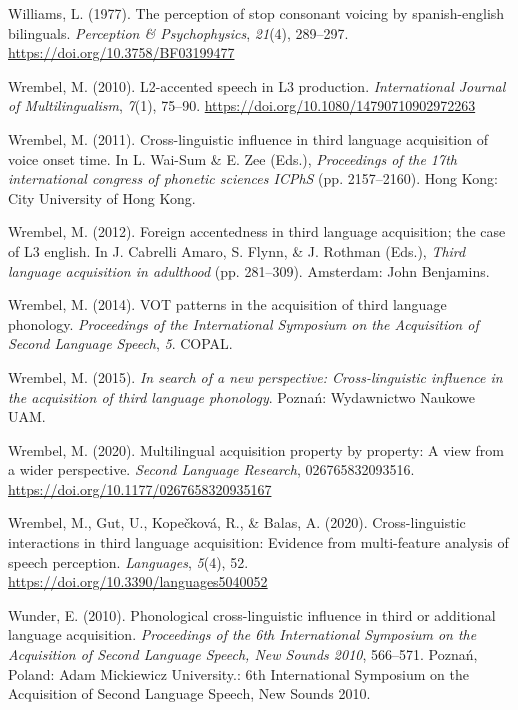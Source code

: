 \documentclass[
  man]{apa6}
\newlength{\cslhangindent}
\newlength{\cslentryspacingunit} %
\newenvironment{CSLReferences}[2] %
 {%
  \setlength{\parindent}{0pt}
  \ifodd #1
  \let\oldpar\par
  \def\par{\hangindent=\cslhangindent\oldpar}
  \fi
  \setlength{\parskip}{#2\cslentryspacingunit}
 }%
 {}
\begin{document}
\begin{CSLReferences}{1}{0}
\leavevmode{}%
Williams, L. (1977). The perception of stop consonant voicing by spanish-english bilinguals. \emph{Perception \& Psychophysics}, \emph{21}(4), 289--297. \url{https://doi.org/10.3758/BF03199477}

\leavevmode{}%
Wrembel, M. (2010). L2-accented speech in L3 production. \emph{International Journal of Multilingualism}, \emph{7}(1), 75--90. \url{https://doi.org/10.1080/14790710902972263}

\leavevmode{}%
Wrembel, M. (2011). Cross-linguistic influence in third language acquisition of voice onset time. In L. Wai-Sum \& E. Zee (Eds.), \emph{Proceedings of the 17th international congress of phonetic sciences {ICPhS}} (pp. 2157--2160). Hong Kong: City University of Hong Kong.

\leavevmode{}%
Wrembel, M. (2012). Foreign accentedness in third language acquisition; the case of L3 english. In J. Cabrelli Amaro, S. Flynn, \& J. Rothman (Eds.), \emph{Third language acquisition in adulthood} (pp. 281--309). Amsterdam: John Benjamins.

\leavevmode{}%
Wrembel, M. (2014). {VOT} patterns in the acquisition of third language phonology. \emph{Proceedings of the International Symposium on the Acquisition of Second Language Speech}, \emph{5}. {COPAL}.

\leavevmode{}%
Wrembel, M. (2015). \emph{In search of a new perspective: Cross-linguistic influence in the acquisition of third language phonology}. Poznań: Wydawnictwo Naukowe {UAM}.

\leavevmode{}%
Wrembel, M. (2020). Multilingual acquisition property by property: A view from a wider perspective. \emph{Second Language Research}, 026765832093516. \url{https://doi.org/10.1177/0267658320935167}

\leavevmode{}%
Wrembel, M., Gut, U., Kopečková, R., \& Balas, A. (2020). Cross-linguistic interactions in third language acquisition: Evidence from multi-feature analysis of speech perception. \emph{Languages}, \emph{5}(4), 52. \url{https://doi.org/10.3390/languages5040052}

\leavevmode{}%
Wunder, E. (2010). Phonological cross-linguistic influence in third or additional language acquisition. \emph{Proceedings of the 6th International Symposium on the Acquisition of Second Language Speech, New Sounds 2010}, 566--571. Poznań, Poland: Adam Mickiewicz University.: 6th International Symposium on the Acquisition of Second Language Speech, New Sounds 2010.

\end{CSLReferences}

\endgroup
\end{document}
